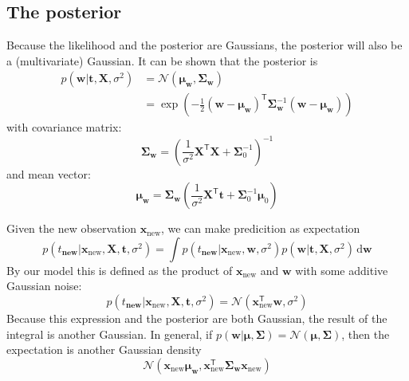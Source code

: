 \subsection{The posterior}
Because the likelihood and the posterior are Gaussians, the posterior will also be
a (multivariate) Gaussian.
It can be shown that the posterior is
\begin{align}
p(\mathbf{w} | \mathbf{t}, \mathbf{X}, \sigma^2) & =
\mathcal{N}(\boldsymbol{\mu}_{\mathbf{w}},\boldsymbol{\Sigma}_{\mathbf{w}}) \\
& = \exp\left(
-\frac{1}{2}(\mathbf{w} - \boldsymbol{\mu}_{\mathbf{w}})^{\mathsf{T}}
\boldsymbol{\Sigma}^{-1}_{\mathbf{w}}
(\mathbf{w} - \boldsymbol{\mu}_{\mathbf{w}})
\right)
\end{align}
with covariance matrix:
\begin{equation}
\boldsymbol{\Sigma}_{\mathbf{w}} = \left(
\frac{1}{\sigma^2}\mathbf{X}^{\mathsf{T}}\mathbf{X} + \boldsymbol{\Sigma}^{-1}_{0}
\right)^{-1}
\end{equation}
and mean vector:
\begin{equation}
\boldsymbol{\mu}_{\mathbf{w}} = \boldsymbol{\Sigma}_{\mathbf{w}}
\left(
\frac{1}{\sigma^2}\mathbf{X}^{\mathsf{T}}\mathbf{t} +
\boldsymbol{\Sigma}_{0}^{-1}\boldsymbol{\mu}_{0}
\right)
\end{equation}

Given the new observation $\mathbf{x}_{\mathrm{new}}$, we can make
predicition as expectation
\begin{equation*}
p(t_{\mathbf{new}} | \mathbf{x}_{\mathrm{new}}, \mathbf{X}, \mathbf{t}, \sigma^2) =
\int p(t_{\mathbf{new}} | \mathbf{x}_{\mathrm{new}}, \mathbf{w}, \sigma^2)
p(\mathbf{w} | \mathbf{t}, \mathbf{X}, \sigma^2)\,\mathrm{d}\mathbf{w}
\end{equation*}
By our model this is defined as the product of $\mathbf{x}_{\mathrm{new}}$
and $\mathbf{w}$ with some additive Gaussian noise:
\begin{equation*}
p(t_{\mathbf{new}} | \mathbf{x}_{\mathrm{new}}, \mathbf{X}, \mathbf{t}, \sigma^2) =
\mathcal{N}(\mathbf{x}_{\mathrm{new}}^{\mathsf{T}}\mathbf{w}, \sigma^2)
\end{equation*}
Because this expression and the posterior are both Gaussian, the result of the
integral is another Gaussian. In general, if
$p(\mathbf{w}|\boldsymbol{\mu},\boldsymbol{\Sigma}) =
\mathcal{N}(\boldsymbol{\mu},\boldsymbol{\Sigma})$, then the expectation
is another Gaussian density
\begin{equation}
\mathcal{N}(\mathbf{x}_{\mathrm{new}}\boldsymbol{\mu}_{\mathbf{w}},
\mathbf{x}_{\mathrm{new}}^{\mathsf{T}}\boldsymbol{\Sigma}_{\mathbf{w}}
\mathbf{x}_{\mathrm{new}})
\end{equation}






